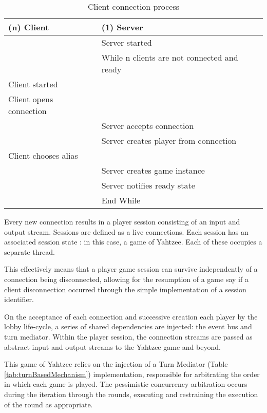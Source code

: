 \begin{table}[H]
	\centering
	\begin{tabular}{ | l | l | }
		\hline
		(n) Client & (1) Server \\
		\hline
		\hline
		 & Server started \\
		 \hline
		 & While n clients are not connected and ready \\
		 \hline
		 Client started  & \\
		 \hline
		Client opens connection & \\
		 \hline
		 & Server accepts connection \\
		 \hline
		 & Server creates player from connection  \\
		 \hline
		Client chooses alias & \\
		 \hline
		& Server creates game instance \\
		\hline
		& Server notifies ready state  \\
		 \hline
		& End While \\
		\hline
	\end{tabular}
	\caption{Client connection process}
	\label{tab:connectionProtocol}
\end{table}

Every new connection results in a player session consisting of an input and output stream. Sessions are defined as a live connections. Each session has an associated session state \parencite[page~456]{fowler2012patterns}: in this case, a game of Yahtzee. Each of these occupies a separate thread.

This effectively means that a player game session can survive independently of a connection being disconnected, allowing for the resumption of a game say if a client disconnection occurred through the simple implementation of a session identifier. \parencite[page~456]{fowler2012patterns}

On the acceptance of each connection and successive creation each player by the lobby life-cycle, a series of shared dependencies are injected: the event bus and turn mediator. Within the player session, the connection streams are passed as abstract input and output streams to the Yahtzee game and beyond.

This game of Yahtzee relies on the injection of a Turn Mediator \parencite{gamma1994design} (Table \ref{tab:turnBasedMechanism}) implementation, responsible for arbitrating the order in which each game is played. The pessimistic concurrency \parencite[page~67]{fowler2012patterns} arbitration occurs during the iteration through the rounds, executing and restraining the execution of the round as appropriate.

